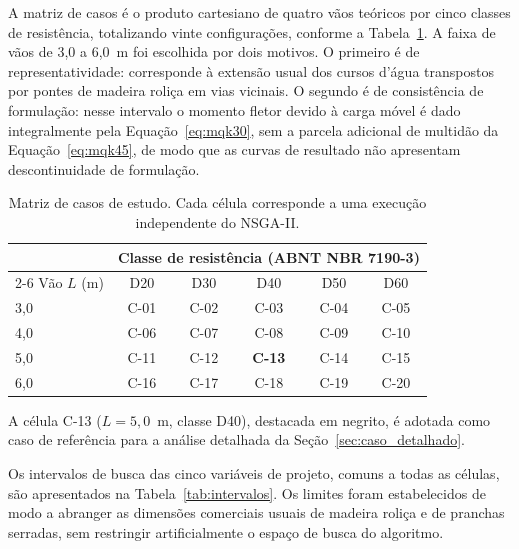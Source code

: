 A matriz de casos é o produto cartesiano de quatro vãos teóricos por cinco classes de resistência, totalizando vinte configurações, conforme a Tabela~\ref{tab:matriz}.
A faixa de vãos de 3{,}0 a 6{,}0~m foi escolhida por dois motivos.
O primeiro é de representatividade: corresponde à extensão usual dos cursos d'água transpostos por pontes de madeira roliça em vias vicinais.
O segundo é de consistência de formulação: nesse intervalo o momento fletor devido à carga móvel é dado integralmente pela Equação~\eqref{eq:mqk30}, sem a parcela adicional de multidão da Equação~\eqref{eq:mqk45}, de modo que as curvas de resultado não apresentam descontinuidade de formulação.

\begin{table}[!ht]
\caption{Matriz de casos de estudo. Cada célula corresponde a uma execução independente do NSGA-II.\label{tab:matriz}}
\begin{threeparttable}
\begin{tabular*}{\columnwidth}{@{\extracolsep\fill}lccccc@{\extracolsep\fill}}
\toprule
 & \multicolumn{5}{c}{Classe de resistência (ABNT NBR 7190-3)} \\
\cmidrule{2-6}
Vão $L$ (m) & D20 & D30 & D40 & D50 & D60 \\
\midrule
3{,}0 & C-01 & C-02 & C-03 & C-04 & C-05 \\
4{,}0 & C-06 & C-07 & C-08 & C-09 & C-10 \\
5{,}0 & C-11 & C-12 & \textbf{C-13} & C-14 & C-15 \\
6{,}0 & C-16 & C-17 & C-18 & C-19 & C-20 \\
\bottomrule
\end{tabular*}
\begin{tablenotes}
\footnotesize
\item A célula C-13 ($L = 5{,}0$~m, classe D40), destacada em negrito, é adotada como caso de referência para a análise detalhada da Seção~\ref{sec:caso_detalhado}.
\end{tablenotes}
\end{threeparttable}
\end{table}

Os intervalos de busca das cinco variáveis de projeto, comuns a todas as células, são apresentados na Tabela~\ref{tab:intervalos}.
Os limites foram estabelecidos de modo a abranger as dimensões comerciais usuais de madeira roliça e de pranchas serradas, sem restringir artificialmente o espaço de busca do algoritmo.

